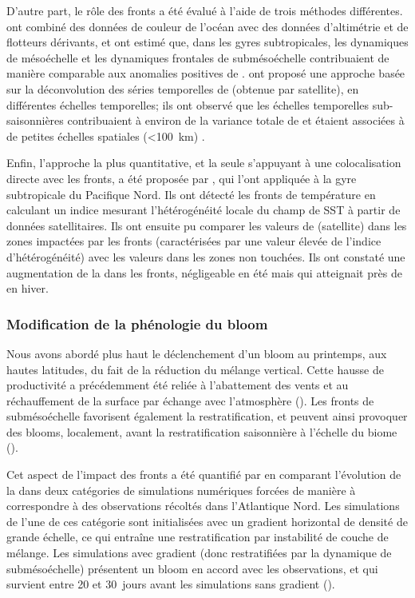 D'autre part, le rôle des fronts a été évalué à l'aide de trois méthodes différentes.
\Textcite{guo_2019} ont combiné des données de couleur de l'océan avec des données d'altimétrie et de flotteurs dérivants, et ont estimé que, dans les gyres subtropicales, les dynamiques de mésoéchelle et les dynamiques frontales de submésoéchelle contribuaient de manière comparable aux anomalies positives de .
\Textcite{keerthi_2022} ont proposé une approche basée sur la déconvolution des séries temporelles de  (obtenue par satellite), en différentes échelles temporelles; ils ont observé que les échelles temporelles sub-saisonnières contribuaient à environ  de la variance totale de  et étaient associées à de petites échelles spatiales (\qty{<100}{\km}) .

Enfin, l'approche la plus quantitative, et la seule s'appuyant à une colocalisation directe avec les fronts, a été proposée par \textcite{liu_2016}, qui l'ont appliquée à la gyre subtropicale du Pacifique Nord.
Ils ont détecté les fronts de température en calculant un indice mesurant l'hétérogénéité locale du champ de SST à partir de données satellitaires.
Ils ont ensuite pu comparer les valeurs de  (satellite) dans les zones impactées par les fronts (caractérisées par une valeur élevée de l'indice d'hétérogénéité) avec les valeurs dans les zones non touchées.
Ils ont constaté une augmentation de la  dans les fronts, négligeable en été mais qui atteignait près de  en hiver.

\subsubsection{Modification de la phénologie du bloom}
\label{sec:modif-phenologie}

Nous avons abordé plus haut le déclenchement d'un bloom au printemps, aux hautes latitudes, du fait de la réduction du mélange vertical.
Cette hausse de productivité a précédemment été reliée à l'abattement des vents et au réchauffement de la surface par échange avec l'atmosphère (\cite{henson_2006,taylor_2011a}).
Les fronts de submésoéchelle favorisent également la restratification, et peuvent ainsi provoquer des blooms, localement, avant la restratification saisonnière à l'échelle du biome (\cite{taylor_2011,karleskind_2011,mahadevan_2012}).

Cet aspect de l'impact des fronts a été quantifié par \textcite{mahadevan_2012} en comparant l'évolution de la  dans deux catégories de simulations numériques forcées de manière à correspondre à des observations récoltés dans l'Atlantique Nord. Les simulations de l'une de ces catégorie sont initialisées avec un gradient horizontal de densité de grande échelle, ce qui entraîne une restratification par instabilité de couche de mélange.
Les simulations avec gradient (donc restratifiées par la dynamique de submésoéchelle) présentent un bloom en accord avec les observations, et qui survient entre 20 et 30~jours avant les simulations sans gradient ().

